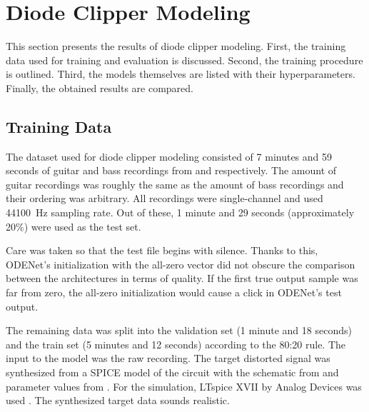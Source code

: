 
\section{Diode Clipper Modeling}
\label{chap:diode_clipper}

This section presents the results of diode clipper modeling. First, the training data used for training and evaluation is discussed. Second, the training procedure is outlined. Third, the models themselves are listed with their hyperparameters. Finally, the obtained results are compared.

\subsection{Training Data}
\label{sec:diode_clipper_training_data}

The dataset used for diode clipper modeling consisted of 7 minutes and 59 seconds of guitar and bass recordings from \cite{Abesser2013} and \cite{Kehling2014} respectively. The amount of guitar recordings was roughly the same as the amount of bass recordings and their ordering was arbitrary. All recordings were single-channel and used \SI{44100}{Hz} sampling rate. Out of these, 1 minute and 29 seconds (approximately 20\%) were used as the test set. 

Care was taken so that the test file begins with silence. Thanks to this, ODENet's initialization with the all-zero vector did not obscure the comparison between the architectures in terms of quality. If the first true output sample was far from zero, the all-zero initialization would cause a click in ODENet's test output. 

The remaining data was split into the validation set (1 minute and 18 seconds) and the train set (5 minutes and 12 seconds) according to the 80:20 rule. The input to the model was the raw recording. The target distorted signal was synthesized from a SPICE model of the circuit with the schematic from  and parameter values from . For the simulation, LTspice XVII by Analog Devices was used \cite{LTspice}. The synthesized target data sounds realistic.

